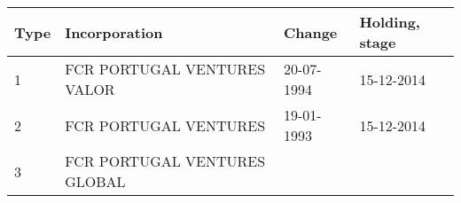 \documentclass[]{book}
\theoremstyle{definition}
\theoremstyle{definition}
\theoremstyle{definition}
\theoremstyle{remark}
\begin{document}
\begin{longtable}[]{@{}llll@{}}
\toprule
\begin{minipage}[b]{0.17\columnwidth}\raggedright\strut
Type\strut
\end{minipage} & \begin{minipage}[b]{0.17\columnwidth}\raggedright\strut
Incorporation\strut
\end{minipage} & \begin{minipage}[b]{0.17\columnwidth}\raggedright\strut
Change\strut
\end{minipage} & \begin{minipage}[b]{0.17\columnwidth}\raggedright\strut
Holding, stage\strut
\end{minipage}\tabularnewline
\midrule
\endhead
\begin{minipage}[t]{0.17\columnwidth}\raggedright\strut
1\strut
\end{minipage} & \begin{minipage}[t]{0.17\columnwidth}\raggedright\strut
FCR PORTUGAL VENTURES VALOR\strut
\end{minipage} & \begin{minipage}[t]{0.17\columnwidth}\raggedright\strut
20-07-1994\strut
\end{minipage} & \begin{minipage}[t]{0.17\columnwidth}\raggedright\strut
15-12-2014\strut
\end{minipage}\tabularnewline
\begin{minipage}[t]{0.17\columnwidth}\raggedright\strut
2\strut
\end{minipage} & \begin{minipage}[t]{0.17\columnwidth}\raggedright\strut
FCR PORTUGAL VENTURES\strut
\end{minipage} & \begin{minipage}[t]{0.17\columnwidth}\raggedright\strut
19-01-1993\strut
\end{minipage} & \begin{minipage}[t]{0.17\columnwidth}\raggedright\strut
15-12-2014\strut
\end{minipage}\tabularnewline
\begin{minipage}[t]{0.17\columnwidth}\raggedright\strut
3\strut
\end{minipage} & \begin{minipage}[t]{0.17\columnwidth}\raggedright\strut
FCR PORTUGAL VENTURES GLOBAL\strut
\end{minipage} & \begin{minipage}[t]{0.17\columnwidth}\raggedright\strut

\end{minipage}
\end{longtable}
\end{document}
